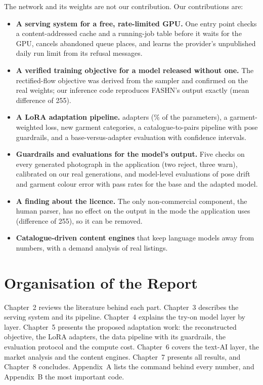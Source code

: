The network and its weights are not our contribution. Our contributions are:

\begin{itemize}
\item \textbf{A serving system for a free, rate-limited GPU.} One entry point checks a content-addressed cache and a running-job table before it waits for the GPU, cancels abandoned queue places, and learns the provider's unpublished daily run limit from its refusal messages.
\item \textbf{A verified training objective for a model released without one.} The rectified-flow objective was derived from the sampler and confirmed on the real weights; our inference code reproduces FASHN's output exactly (mean difference \vEquivDiff{} of 255).
\item \textbf{A LoRA adaptation pipeline.} \vLoraLayers{} adapters (\vLoraPct{}\% of the parameters), a garment-weighted loss, new garment categories, a catalogue-to-pairs pipeline with pose guardrails, and a base-versus-adapter evaluation with confidence intervals.
\item \textbf{Guardrails and evaluations for the model's output.} Five checks on every generated photograph in the application (two reject, three warn), calibrated on our real generations, and model-level evaluations of pose drift and garment colour error with pass rates for the base and the adapted model.
\item \textbf{A finding about the licence.} The only non-commercial component, the human parser, has no effect on the output in the mode the application uses (difference \vParserDiff{} of 255), so it can be removed.
\item \textbf{Catalogue-driven content engines} that keep language models away from numbers, with a demand analysis of real listings.
\end{itemize}

\section{Organisation of the Report}

Chapter~2 reviews the literature behind each part. Chapter~3 describes the serving system and its pipeline. Chapter~4 explains the try-on model layer by layer. Chapter~5 presents the proposed adaptation work: the reconstructed objective, the LoRA adapters, the data pipeline with its guardrails, the evaluation protocol and the compute cost. Chapter~6 covers the text-AI layer, the market analysis and the content engines. Chapter~7 presents all results, and Chapter~8 concludes. Appendix~A lists the command behind every number, and Appendix~B the most important code.
